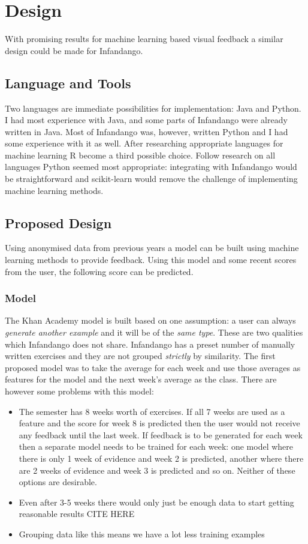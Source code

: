\chapter{Design}
\label{design}
With promising results for machine learning based visual feedback a similar design could be made for Infandango.
\section{Language and Tools}
Two languages are immediate possibilities for implementation: Java\cite{java_site} and Python\cite{python_site}. I had most experience with Java, and some parts of Infandango were already written in Java. Most of Infandango was, however, written Python and I had some experience with it as well. After researching appropriate languages for machine learning R\cite{r_site} become a third possible choice. Follow research on all languages Python seemed most appropriate: integrating with Infandango would be straightforward and scikit-learn\cite{scikit_site} would remove the challenge of implementing machine learning methods.
\section{Proposed Design}
Using anonymised data from previous years a model can be built using machine learning methods to provide feedback. Using this model and some recent scores from the user, the following score can be predicted. 
\subsection{Model}
The Khan Academy model is built based on one assumption: a user can always \emph{generate another example} and it will be of the \emph{same type}. These are two qualities which Infandango does not share. Infandango has a preset number of manually written exercises and they are not grouped \emph{strictly} by similarity. The first proposed model was to take the average for each week and use those averages as features for the model and the next week's average as the class. There are however some problems with this model:

\begin{itemize}
\item The semester has 8 weeks worth of exercises. If all 7 weeks are used as a feature and the score for week 8 is predicted then the user would not receive any feedback until the last week. If feedback is to be generated for each week then a separate model needs to be trained for each week: one model where there is only 1 week of evidence and week 2 is predicted, another where there are 2 weeks of evidence and week 3 is predicted and so on. Neither of these options are desirable.
\item Even after 3-5 weeks there would only just be enough data to start getting reasonable results CITE HERE %
\item Grouping data like this means we have a lot less training examples
\end{itemize}

